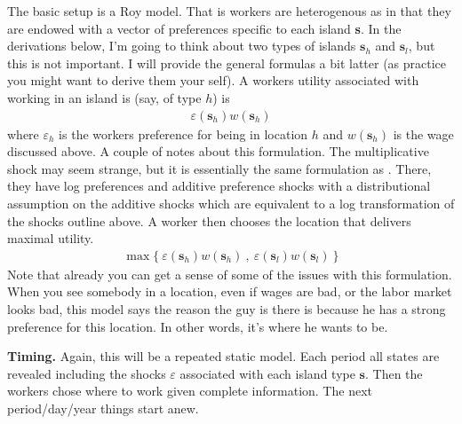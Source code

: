 \documentclass[pdftex,12pt]{article}
\begin{document}
\medskip
\noindent The basic setup is a Roy model. That is workers are heterogenous as in that they are endowed with a vector of preferences specific to each island \textbf{s}. In the derivations below, I'm going to think about two types of islands $\textbf{s}_h$ and $\textbf{s}_l$, but this is not important. I will provide the general formulas a bit latter (as practice you might want to derive them your self). A workers utility associated with working in an island is (say, of type $h$) is
\begin{align}
\varepsilon(\textbf{s}_h) w(\textbf{s}_h)
\end{align}
where $\varepsilon_h$ is the workers preference for being in location $h$ and $w(\textbf{s}_h)$ is the wage discussed above. A couple of notes about this formulation. The multiplicative shock may seem strange, but it is essentially the same formulation as \citet{caliendo2015trade}. There, they have log preferences and additive preference shocks with a distributional assumption on the additive shocks which are equivalent to a log transformation of the shocks outline above. A worker then chooses the location that delivers maximal utility.
\begin{align}
\max\{\ \varepsilon(\textbf{s}_h)  w(\textbf{s}_h) \ , \ \varepsilon(\textbf{s}_l)  w(\textbf{s}_l) \ \}
\label{eq:worker_choice}
\end{align}
Note that already you can get a sense of some of the issues with this formulation. When you see somebody in a location, even if wages are bad, or the labor market looks bad, this model says the reason the guy is there is because he has a strong preference for this location. In other words, it's where he wants to be. 

\medskip
\noindent \textbf{Timing.} Again, this will be a repeated static model. Each period all states are revealed including the shocks $\varepsilon$ associated with each island type $\textbf{s}$. Then the workers chose where to work given complete information. The next period/day/year things start anew. 
\end{document}
